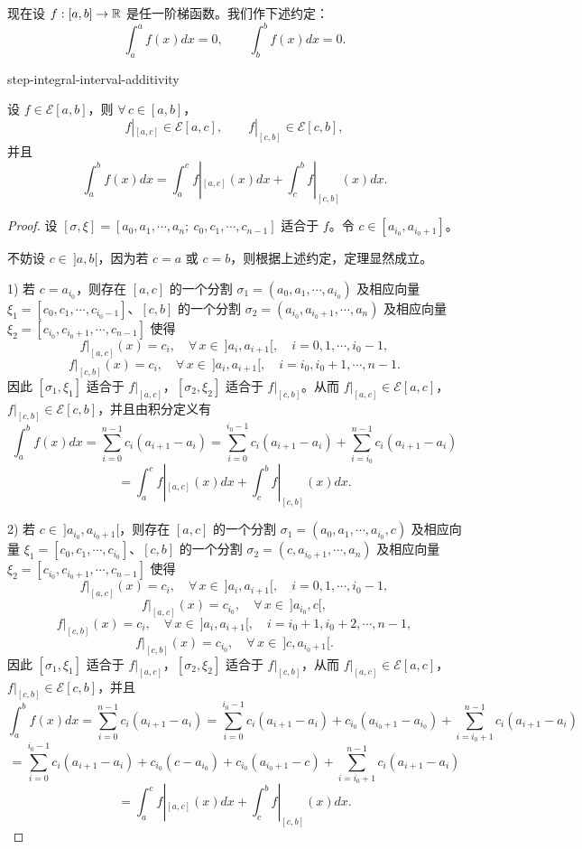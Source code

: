 现在设 \(f:[a,b]\to\mathbb{R}\) 是任一阶梯函数。我们作下述约定：
\[
\int_a^a f(x)dx=0,\qquad \int_b^b f(x)dx=0.
\]

\begin{mythm}{}{step-integral-interval-additivity}

	设 \(f\in\mathscr{E}[a,b]\)，则 \(\forall\,c\in[a,b]\)，
	\[
	f|_{[a,c]}\in\mathscr{E}[a,c],\qquad f|_{[c,b]}\in\mathscr{E}[c,b],
	\]
	并且
	\[
	\int_a^b f(x)dx=\int_a^c f|_{[a,c]}(x)dx+\int_c^b f|_{[c,b]}(x)dx.
	\]

\end{mythm}

\begin{proof}

	设 \([\sigma,\xi]=[a_0,a_1,\cdots,a_n;\ c_0,c_1,\cdots,c_{n-1}]\) 适合于 \(f\)。令 \(c\in[a_{i_0},a_{i_0+1}]\)。

	不妨设 \(c\in\ ]a,b[\)，因为若 \(c=a\) 或 \(c=b\)，则根据上述约定，定理显然成立。

	1) 若 \(c=a_{i_0}\)，则存在 \([a,c]\) 的一个分割 \(\sigma_1=(a_0,a_1,\cdots,a_{i_0})\) 及相应向量 \(\xi_1=[c_0,c_1,\cdots,c_{i_0-1}]\)、\([c,b]\) 的一个分割 \(\sigma_2=(a_{i_0},a_{i_0+1},\cdots,a_n)\) 及相应向量 \(\xi_2=[c_{i_0},c_{i_0+1},\cdots,c_{n-1}]\) 使得
	\[
	f|_{[a,c]}(x)=c_i,\quad \forall\,x\in\ ]a_i,a_{i+1}[,\quad i=0,1,\cdots,i_0-1,
	\]
	\[
	f|_{[c,b]}(x)=c_i,\quad \forall\,x\in\ ]a_i,a_{i+1}[,\quad i=i_0,i_0+1,\cdots,n-1.
	\]
	因此 \([\sigma_1,\xi_1]\) 适合于 \(f|_{[a,c]}\)，\([\sigma_2,\xi_2]\) 适合于 \(f|_{[c,b]}\)。从而 \(f|_{[a,c]}\in\mathscr{E}[a,c]\)，\(f|_{[c,b]}\in\mathscr{E}[c,b]\)，并且由积分定义有
	\[
	\int_a^b f(x)dx=\sum_{i=0}^{n-1}c_i(a_{i+1}-a_i)
	=\sum_{i=0}^{i_0-1}c_i(a_{i+1}-a_i)+\sum_{i=i_0}^{n-1}c_i(a_{i+1}-a_i)
	\]
	\[
	=\int_a^c f|_{[a,c]}(x)dx+\int_c^b f|_{[c,b]}(x)dx.
	\]

	2) 若 \(c\in\ ]a_{i_0},a_{i_0+1}[\)，则存在 \([a,c]\) 的一个分割 \(\sigma_1=(a_0,a_1,\cdots,a_{i_0},c)\) 及相应向量 \(\xi_1=[c_0,c_1,\cdots,c_{i_0}]\)、\([c,b]\) 的一个分割 \(\sigma_2=(c,a_{i_0+1},\cdots,a_n)\) 及相应向量 \(\xi_2=[c_{i_0},c_{i_0+1},\cdots,c_{n-1}]\) 使得
	\[
	f|_{[a,c]}(x)=c_i,\quad \forall\,x\in\ ]a_i,a_{i+1}[,\quad i=0,1,\cdots,i_0-1,
	\]
	\[
	f|_{[a,c]}(x)=c_{i_0},\quad \forall\,x\in\ ]a_{i_0},c[,
	\]
	\[
	f|_{[c,b]}(x)=c_i,\quad \forall\,x\in\ ]a_i,a_{i+1}[,\quad i=i_0+1,i_0+2,\cdots,n-1,
	\]
	\[
	f|_{[c,b]}(x)=c_{i_0},\quad \forall\,x\in\ ]c,a_{i_0+1}[.
	\]
	因此 \([\sigma_1,\xi_1]\) 适合于 \(f|_{[a,c]}\)，\([\sigma_2,\xi_2]\) 适合于 \(f|_{[c,b]}\)，从而 \(f|_{[a,c]}\in\mathscr{E}[a,c]\)，\(f|_{[c,b]}\in\mathscr{E}[c,b]\)，并且
	\[
	\int_a^b f(x)dx=\sum_{i=0}^{n-1}c_i(a_{i+1}-a_i)
	=\sum_{i=0}^{i_0-1}c_i(a_{i+1}-a_i)+c_{i_0}(a_{i_0+1}-a_{i_0})+\sum_{i=i_0+1}^{n-1}c_i(a_{i+1}-a_i)
	\]
	\[
	=\sum_{i=0}^{i_0-1}c_i(a_{i+1}-a_i)+c_{i_0}(c-a_{i_0})+c_{i_0}(a_{i_0+1}-c)+\sum_{i=i_0+1}^{n-1}c_i(a_{i+1}-a_i)
	\]
	\[
	=\int_a^c f|_{[a,c]}(x)dx+\int_c^b f|_{[c,b]}(x)dx.
	\]

\end{proof}

